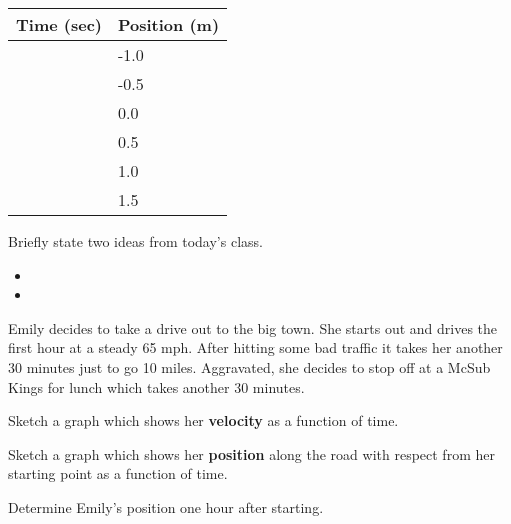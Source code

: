 \begin{problem}
\begin{subproblem}
      \begin{tabular}{l|l}
        Time (sec) & Position (m) \\ \hline
         & -1.0 \\ [12pt]
         & -0.5 \\  [12pt]
         &  0.0 \\  [12pt]
         &  0.5 \\  [12pt]
         &  1.0 \\  [12pt]
         &  1.5
      \end{tabular}

\end{subproblem}

\end{problem}


\postClass

\begin{problem}
\item Briefly state two ideas from today's class.
  \begin{itemize}
  \item
  \item
  \end{itemize}
\item Emily decides to take a drive out to the big town. She starts
  out and drives the first hour at a steady 65 mph. After hitting some
  bad traffic it takes her another 30 minutes just to go 10
  miles. Aggravated, she decides to stop off at a McSub Kings for
  lunch which takes another 30 minutes.


  \begin{subproblem}
  \item Sketch a graph which shows her \textbf{velocity} as a function
    of time.


      \vfill

    \item Sketch a graph which shows her \textbf{position} along the
      road with respect from her starting point as a function of time.


    \vfill

    \item Determine Emily's position one hour after starting.
      \vspace{3em}


\end{subproblem}
\end{problem}
